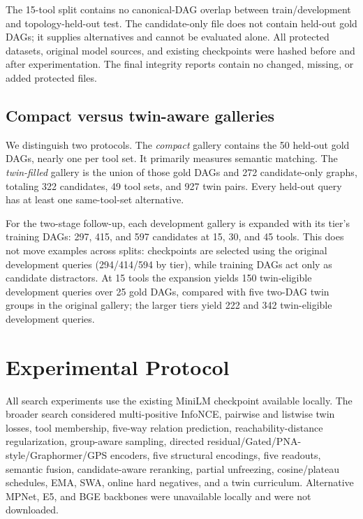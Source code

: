 \documentclass{article}
\begin{document}
The 15-tool split contains no canonical-DAG overlap between train/development and topology-held-out test.
The candidate-only file does not contain held-out gold DAGs; it supplies alternatives and cannot be evaluated alone.
All protected datasets, original model sources, and existing checkpoints were hashed before and after experimentation.
The final integrity reports contain no changed, missing, or added protected files.

\subsection{Compact versus twin-aware galleries}

We distinguish two protocols.
The \emph{compact} gallery contains the 50 held-out gold DAGs, nearly one per tool set.
It primarily measures semantic matching.
The \emph{twin-filled} gallery is the union of those gold DAGs and 272 candidate-only graphs, totaling 322 candidates, 49 tool sets, and 927 twin pairs.
Every held-out query has at least one same-tool-set alternative.

For the two-stage follow-up, each development gallery is expanded with its tier's training DAGs: 297, 415, and 597 candidates at 15, 30, and 45 tools.
This does not move examples across splits: checkpoints are selected using the original development queries (294/414/594 by tier), while training DAGs act only as candidate distractors.
At 15 tools the expansion yields 150 twin-eligible development queries over 25 gold DAGs, compared with five two-DAG twin groups in the original gallery; the larger tiers yield 222 and 342 twin-eligible development queries.

\section{Experimental Protocol}

All search experiments use the existing MiniLM checkpoint available locally.
The broader search considered multi-positive InfoNCE, pairwise and listwise twin losses, tool membership, five-way relation prediction, reachability-distance regularization, group-aware sampling, directed residual/Gated/PNA-style/Graphormer/GPS encoders, five structural encodings, five readouts, semantic fusion, candidate-aware reranking, partial unfreezing, cosine/plateau schedules, EMA, SWA, online hard negatives, and a twin curriculum.
Alternative MPNet, E5, and BGE backbones were unavailable locally and were not downloaded.
\end{document}
